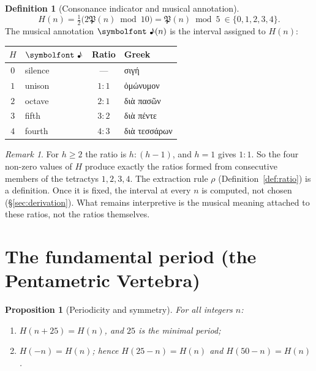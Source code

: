 \documentclass[11pt,a4paper]{article}
\newcommand{\gr}[1]{{\greekfont #1}}                 %
\newcommand{\Pent}{\mathfrak{P}}                      %
\newcommand{\note}{\text{\symbolfont ♪}}              %
\theoremstyle{plain}
\newtheorem{proposition}[theorem]{Proposition}
\theoremstyle{definition}
\newtheorem{definition}[theorem]{Definition}
\theoremstyle{remark}
\newtheorem{remark}[theorem]{Remark}
\begin{document}
\begin{definition}[Consonance indicator and musical annotation]
\[
  H(n)=\tfrac12\bigl(2\Pent(n)\bmod 10\bigr)=\Pent(n)\bmod 5\ \in\{0,1,2,3,4\}.
\]
The musical annotation $\note(n)$ is the interval assigned to $H(n)$:
\begin{center}
\begin{tabular}{@{}clcl@{}}
\toprule
$H$ & $\note$ & Ratio & Greek \\
\midrule
$0$ & silence & — & \gr{σιγή} \\
$1$ & unison & $1:1$ & \gr{ὁμώνυμον} \\
$2$ & octave & $2:1$ & \gr{διὰ πασῶν} \\
$3$ & fifth & $3:2$ & \gr{διὰ πέντε} \\
$4$ & fourth & $4:3$ & \gr{διὰ τεσσάρων} \\
\bottomrule
\end{tabular}
\end{center}
\end{definition}

\begin{remark}
For $h\ge2$ the ratio is $h:(h-1)$, and $h=1$ gives $1:1$. So the four non-zero values of $H$ produce exactly the ratios formed from consecutive members of the tetractys $1,2,3,4$. The extraction rule $\rho$ (Definition~\ref{def:ratio}) is a definition. Once it is fixed, the interval at every $n$ is computed, not chosen (§\ref{sec:derivation}). What remains interpretive is the musical meaning attached to these ratios, not the ratios themselves.
\end{remark}

\section{The fundamental period (the Pentametric Vertebra)}\label{sec:vertebra}

\begin{proposition}[Periodicity and symmetry]\label{prop:period}
For all integers $n$:
\begin{enumerate}[label=(\alph*),itemsep=1pt]
  \item $H(n+25)=H(n)$, and $25$ is the minimal period;
  \item $H(-n)=H(n)$; hence $H(25-n)=H(n)$ and $H(50-n)=H(n)$.
\end{enumerate}
\end{proposition}
\end{document}
